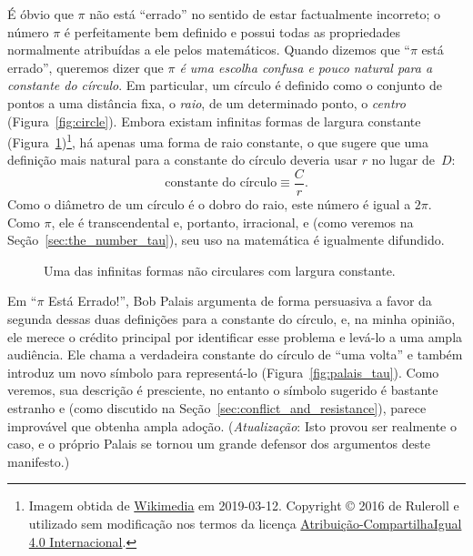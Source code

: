 É óbvio que $\pi$ não está ``errado'' no sentido de estar factualmente incorreto; o número $\pi$ é perfeitamente bem definido e possui todas as propriedades normalmente atribuídas a ele pelos matemáticos. Quando dizemos que ``$\pi$ está errado'', queremos dizer que \emph{$\pi$ é uma escolha confusa e pouco natural para a constante do círculo}. Em particular, um círculo é definido como o conjunto de pontos a uma distância fixa, o \emph{raio}, de um determinado ponto, o \emph{centro} (Figura~\ref{fig:circle}). Embora existam infinitas formas de largura constante (Figura~\ref{fig:constant_width})\footnote{Imagem obtida de \href{https://commons.wikimedia.org/wiki/File:Reuleaux_triangle_roll.gif}{Wikimedia} em 2019-03-12. Copyright © 2016 de Ruleroll e utilizado sem modificação nos termos da licença \href{https://creativecommons.org/licenses/by-sa/4.0/deed.pt_BR}{Atribuição-CompartilhaIgual 4.0 Internacional}.}, há apenas uma forma de raio constante, o que sugere que uma definição mais natural para a constante do círculo deveria usar $r$ no lugar de~$D$:
\begin{equation}
\label{eq:circle_constant}
\mbox{constante do círculo} \equiv \frac{C}{r}.
\end{equation}
Como o diâmetro de um círculo é o dobro do raio, este número é igual a $2\pi$. Como $\pi$, ele é transcendental e, portanto, irracional, e (como veremos na Seção~\ref{sec:the_number_tau}), seu uso na matemática é igualmente difundido.

\begin{figure}
\caption{Uma das infinitas formas não circulares com largura constante.\label{fig:constant_width}}
\end{figure}

Em ``$\pi$ Está Errado!'', Bob Palais argumenta de forma persuasiva a favor da segunda dessas duas definições para a constante do círculo, e, na minha opinião, ele merece o crédito principal por identificar esse problema e levá-lo a uma ampla audiência. Ele chama a verdadeira constante do círculo de ``uma volta'' e também introduz um novo símbolo para representá-lo (Figura~\ref{fig:palais_tau}). Como veremos, sua descrição é presciente, no entanto o símbolo sugerido é bastante estranho e (como discutido na Seção~\ref{sec:conflict_and_resistance}), parece improvável que obtenha ampla adoção. (\emph{Atualização}: Isto provou ser realmente o caso, e o próprio Palais se tornou um grande defensor dos argumentos deste manifesto.)

